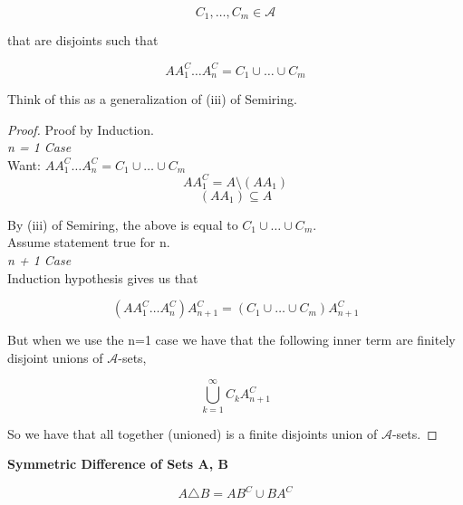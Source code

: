 \documentclass[11pt,fleqn]{book} %
\begin{document}
		$$C_1, \dots, C_m \in \mathcal{A} $$

that are disjoints such that

		$$A A_1^C \dots A_n^C = C_1 \cup \dots \cup C_m $$

Think of this as a generalization of (iii) of Semiring. \\

\begin{proof}
	Proof by Induction.\\

	\textit{n = 1 Case}\\

	Want: $AA_1^C \dots A_n^C =C_1 \cup \dots \cup C_m $\\

			$$ A A_1^C = A \setminus (AA_1)$$ 
			$$ (AA_1) \subseteq A $$

	By (iii) of Semiring, the above is equal to $C_1 \cup \dots \cup C_m$. \\

	Assume statement true for n. \\

	\textit{n + 1 Case}\\

		Induction hypothesis gives us that

			$$(AA_1^C \dots A_n^C) A^C_{n+1} = (C_1 \cup \dots \cup C_m) A^C_{n+1}  $$


		But when we use the n=1 case we have that the following inner term are finitely disjoint unions of $\mathcal{A}$-sets, 

			$$ \bigcup^\infty_{k=1} C_k A^C_{n+1} $$

		So we have that all together (unioned) is a finite disjoints union of $\mathcal{A}$-sets.

\end{proof}

\textbf{Symmetric Difference of Sets A, B}\\


\begin{notation}
	$$A \triangle B = AB^C \cup BA^C$$
\end{notation}
\end{document}
